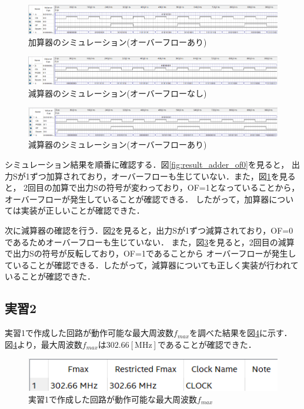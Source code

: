 \documentclass{jlreq}
\numberwithin{equation}{section}
\begin{document}
\begin{figure}[H]
  \centering
  \includegraphics[width=\textwidth]{assets/add_A_01010101_OF_1.png}
  \caption{加算器のシミュレーション(オーバーフローあり)}
  \label{fig:result_adder_of1}
\end{figure}

\begin{figure}[H]
  \centering
  \includegraphics[width=\textwidth]{assets/sub_A_1_OF_0.png}
  \caption{減算器のシミュレーション(オーバーフローなし)}
  \label{fig:result_sub_of0}
\end{figure}

\begin{figure}[H]
  \centering
  \includegraphics[width=\textwidth]{assets/sub_A_01010101_OF_1.png}
  \caption{減算器のシミュレーション(オーバーフローあり)}
  \label{fig:result_sub_of1}
\end{figure}

シミュレーション結果を順番に確認する．図\ref{fig:result_adder_of0}を見ると，
出力Sが1ずつ加算されており，オーバーフローも生じていない．また，図\ref{fig:result_adder_of1}を見ると，
2回目の加算で出力Sの符号が変わっており，OF=1となっていることから，オーバーフローが発生していることが確認できる．
したがって，加算器については実装が正しいことが確認できた．

次に減算器の確認を行う．図\ref{fig:result_sub_of0}を見ると，出力Sが1ずつ減算されており，OF=0であるためオーバーフローも生じていない．
また，図\ref{fig:result_sub_of1}を見ると，2回目の減算で出力Sの符号が反転しており，OF=1であることから
オーバーフローが発生していることが確認できる．したがって，減算器についても正しく実装が行われていることが確認できた．

\subsection{実習2}
実習1で作成した回路が動作可能な最大周波数$f_{max}$を調べた結果を図\ref{fig:fmax_ripple_addsub}に示す．
図\ref{fig:fmax_ripple_addsub}より，最大周波数$f_{max}$は$302.66[\si{\MHz}]$であることが確認できた．
\begin{figure}[H]
  \centering
  \includegraphics{assets/fmax_ripple_addsub.png}
  \caption{実習1で作成した回路が動作可能な最大周波数$f_{max}$}
  \label{fig:fmax_ripple_addsub}
\end{figure}
\end{document}
